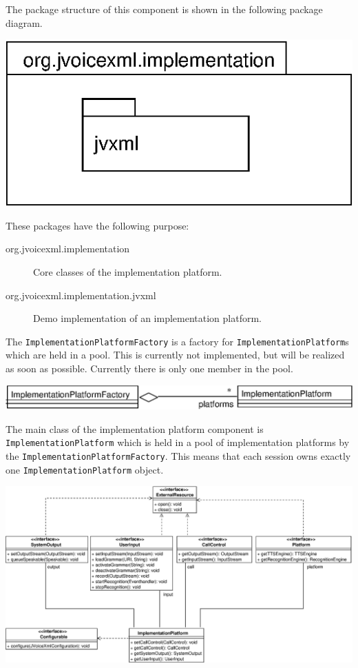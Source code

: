 \documentclass[11pt,a4paper]{article}
\begin{document}
The package structure of this component is shown in the following
package diagram.

\begin{center}
\includegraphics{package-org.jvoicexml.implementation.eps}
\end{center}

These packages have the following purpose:

\begin{description}
\item[org.jvoicexml.implementation] Core classes of the implementation
platform.
\item[org.jvoicexml.implementation.jvxml] Demo implementation of
an implementation platform.
\end{description}

The \texttt{ImplementationPlatformFactory} is a factory for
\texttt{Implementation\-Platform}s which are held in a pool.
This is currently not implemented, but will be realized as soon as possible.
Currently there is only one member in the pool.

\begin{center}
\includegraphics[scale=0.8]{class-implementationplatformfactory.eps}
\end{center}

The main class of the implementation platform component is 
\texttt{Implemen\-tat\-ion\-Plat\-form} which is held in a pool of 
implementation
platforms by the \texttt{Implementat\-ionPlat\-form\-Factory}. This means
that each session owns exactly one \texttt{Implemen\-tat\-ionPlat\-form}
object.

\begin{center}
\includegraphics[scale=0.4]{class-implementation-implementationplatform.eps}
\end{center}
\end{document}
